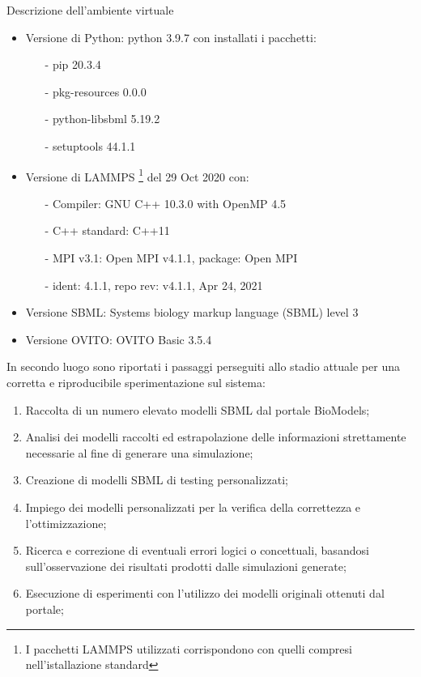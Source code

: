 \documentclass[Lau, oneside]{sapthesis}
\begin{document}
\noindent Descrizione dell'ambiente virtuale
\begin{itemize}
    \item Versione di Python: python 3.9.7 con installati i pacchetti:
    \begin{itemize}
        \item[-]  pip               \hspace*{54pt}  20.3.4
        \item[-]  pkg-resources     \hspace*{6pt}   0.0.0
        \item[-]  python-libsbml    \hspace*{0.5pt} 5.19.2
        \item[-]  setuptools        \hspace*{24pt}  44.1.1
    \end{itemize}
    \item Versione di LAMMPS \footnote{I pacchetti LAMMPS utilizzati corrispondono con quelli compresi nell'istallazione standard } del 29 Oct 2020 con:
       \begin{itemize}
        \item[-]  Compiler: GNU C++ 10.3.0 with OpenMP 4.5
        \item[-]  C++ standard: C++11
        \item[-]  MPI v3.1: Open MPI v4.1.1, package: Open MPI
        \item[-]  ident: 4.1.1, repo rev: v4.1.1, Apr 24, 2021
    \end{itemize}
    \item Versione SBML: Systems biology markup language (SBML) level 3
    \item Versione OVITO: OVITO Basic 3.5.4
\end{itemize}


In secondo luogo sono riportati i passaggi perseguiti allo stadio attuale per una corretta e riproducibile sperimentazione sul sistema:
\begin{enumerate}
    \item Raccolta di un numero elevato modelli SBML dal portale BioModels;
    \item Analisi dei modelli raccolti ed estrapolazione delle informazioni strettamente necessarie al fine di generare una simulazione;
    \item Creazione di modelli SBML di testing personalizzati;
    \item Impiego dei modelli personalizzati per la verifica della correttezza e l'ottimizzazione;
    \item Ricerca e correzione di eventuali errori logici o concettuali, basandosi sull'osservazione dei risultati prodotti dalle simulazioni generate;
    \item Esecuzione di esperimenti con l'utilizzo dei modelli originali ottenuti dal portale;
\end{enumerate}
\end{document}

